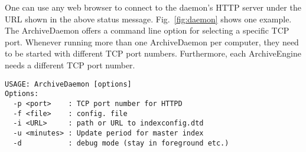 \noindent One can use any web browser to connect to the daemon's HTTP server
under the URL shown in the above status message. Fig.~\ref{fig:daemon}
shows one example. The ArchiveDaemon offers a command line option for
selecting a specific TCP port.
Whenever running more than one ArchiveDaemon per computer, they
need to be started with different TCP port numbers. Furthermore, each
ArchiveEngine needs a different TCP port number.
\begin{lstlisting}[keywordstyle=\sffamily]
USAGE: ArchiveDaemon [options] 
Options:
  -p <port>    : TCP port number for HTTPD
  -f <file>    : config. file
  -i <URL>     : path or URL to indexconfig.dtd
  -u <minutes> : Update period for master index
  -d           : debug mode (stay in foreground etc.)
\end{lstlisting}

